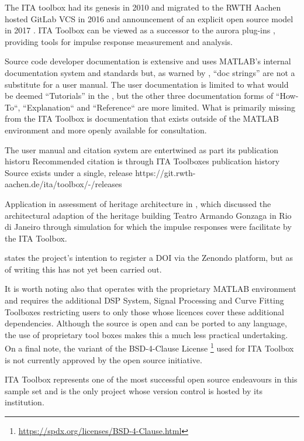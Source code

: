 The ITA toolbox  had its genesis in 2010 \cite{dietrich_matlab_2010} and migrated to the RWTH Aachen hosted GitLab VCS in 2016 and announcement of  an explicit open source model in 2017 \cite{berzborn_ita_2017}. ITA Toolbox can be viewed as a successor to the aurora plug-ins \cite{dietrich_influence_2013}, providing tools for impulse response measurement and analysis. 

Source code developer documentation is extensive and uses MATLAB's internal documentation system and standards but, as warned by \textcite{stallman_gnu_1992}, ``doc strings'' are not a substitute for a user manual. The user documentation is limited to what would be deemed ``Tutorials'' in the  \cite{procida_diataxis_2025}, but the other three documentation forms of ``How-To``, ``Explanation`` and ``Reference`` are more limited. What is primarily missing from the ITA Toolbox is documentation that exists outside of the M\textsc{ATLAB} environment and more openly available for consultation. 

The user manual and citation system are entertwined as part its publication historu
Recommended citation is through ITA Toolboxes publication history
Source exists under a single, release https://git.rwth-aachen.de/ita/toolbox/-/releases

Application in assessment of heritage architecture in \textcite{fagerlande_adequaccao_2020}, which discussed the architectural adaption of the heritage building Teatro Armando Gonzaga in Rio di Janeiro through simulation for which the impulse responses were facilitate by the ITA Toolbox.  

\textcite{berzborn_ita_2017} states the project's intention to register a DOI via the Zenondo platform, but as of writing this has not yet been carried out.

It is worth noting also that operates with the proprietary MATLAB environment and requires the additional DSP System, Signal Processing  and Curve Fitting Toolboxes restricting users to only those whose licences cover these additional dependencies. Although the source is open and can be ported to any language, the use of proprietary tool boxes makes this a much less practical undertaking. On a final note, the variant of the BSD-4-Clause License
\footnote{\url{https://spdx.org/licenses/BSD-4-Clause.html}}
used for ITA Toolbox is not currently approved by the open source initiative. 


ITA Toolbox represents one of the most successful open source endeavours in this sample set and is the only project whose version control is hosted by its institution.



